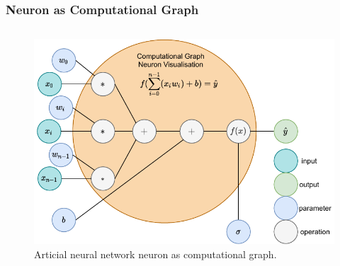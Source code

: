 \documentclass[aspectratio=169]{beamer}
\begin{document}
  \begin{frame}
    \frametitle{Neuron as Computational Graph}
    \begin{columns}
      \begin{column}{0.5\textwidth}
        \begin{figure}[th!]
          \centering
          \includegraphics[width=1\textwidth]{neuron_computational_graph.pdf}
          \caption{Articial neural network neuron as computational graph. \autocite{repository}}
          \label{fig:neuron}
        \end{figure}
      \end{column}
    \end{columns}
  \end{frame}
\end{document}
